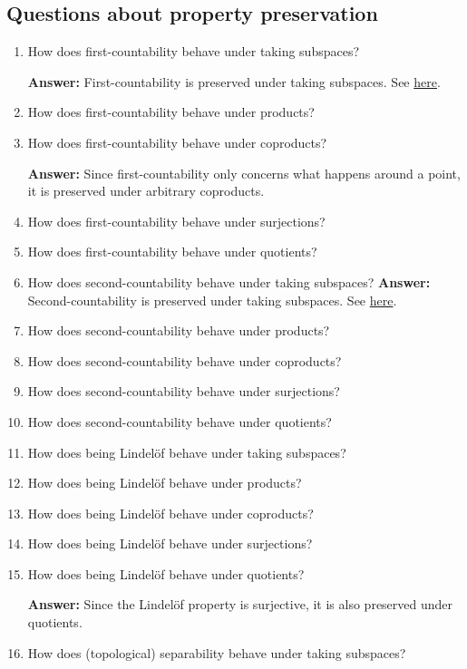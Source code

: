 \subsection{Questions about property preservation}
\begin{enumerate}
    \item How does first-countability behave under taking subspaces?

    \textbf{Answer: } First-countability is preserved under taking subspaces. See \hyperlink{FirstSecondCountabilityHereditary}{here}.
    \item How does first-countability behave under products?
    \item How does first-countability behave under coproducts?

    \textbf{Answer: } Since first-countability only concerns what happens around a point, it is preserved under arbitrary coproducts.
    \item How does first-countability behave under surjections?
    \item How does first-countability behave under quotients?
    \item How does second-countability behave under taking subspaces?
    \textbf{Answer: } Second-countability is preserved under taking subspaces. See \hyperlink{FirstSecondCountabilityHereditary}{here}.
    \item How does second-countability behave under products?
    \item How does second-countability behave under coproducts?
    \item How does second-countability behave under surjections?
    \item How does second-countability behave under quotients?
    \item How does being Lindel\"of behave under taking subspaces?
    \item How does being Lindel\"of behave under products?
    \item How does being Lindel\"of behave under coproducts?
    \item How does being Lindel\"of behave under surjections?
    \item How does being Lindel\"of behave under quotients?

    \textbf{Answer:} Since the Lindel\"of property is surjective, it is also preserved under quotients.
    \item How does (topological) separability behave under taking subspaces?
    

\end{enumerate}
